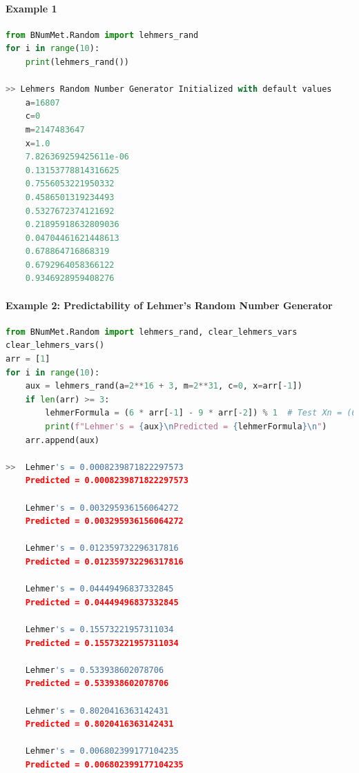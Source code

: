 \paragraph{Example 1}{
\begin{lstlisting}[language=Python]
from BNumMet.Random import lehmers_rand
for i in range(10):
    print(lehmers_rand())

>> Lehmers Random Number Generator Initialized with default values
	a=16807
	c=0
	m=2147483647
	x=1.0
    7.826369259425611e-06
    0.13153778814316625
    0.7556053221950332
    0.4586501319234493
    0.5327672374121692
    0.21895918632809036
    0.04704461621448613
    0.678864716868319
    0.6792964058366122
    0.9346928959408276
\end{lstlisting}
}
\paragraph{Example 2: Predictability of Lehmer's Random Number Generator}{
\begin{lstlisting}[language=Python]
from BNumMet.Random import lehmers_rand, clear_lehmers_vars
clear_lehmers_vars()
arr = [1]
for i in range(10):
    aux = lehmers_rand(a=2**16 + 3, m=2**31, c=0, x=arr[-1])
    if len(arr) >= 3:
        lehmerFormula = (6 * arr[-1] - 9 * arr[-2]) % 1  # Test Xn = (6Xn-1 - 9Xn-2)
        print(f"Lehmer's = {aux}\nPredicted = {lehmerFormula}\n")
    arr.append(aux)

>>  Lehmer's = 0.0008239871822297573
    Predicted = 0.0008239871822297573
    
    Lehmer's = 0.003295936156064272
    Predicted = 0.003295936156064272
    
    Lehmer's = 0.012359732296317816
    Predicted = 0.012359732296317816
    
    Lehmer's = 0.04449496837332845
    Predicted = 0.04449496837332845
    
    Lehmer's = 0.15573221957311034
    Predicted = 0.15573221957311034
    
    Lehmer's = 0.533938602078706
    Predicted = 0.533938602078706
    
    Lehmer's = 0.8020416363142431
    Predicted = 0.8020416363142431
    
    Lehmer's = 0.006802399177104235
    Predicted = 0.006802399177104235
\end{lstlisting}
}
